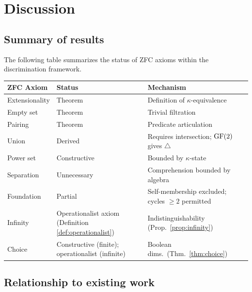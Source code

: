 \section{Discussion}\label{sec:discussion}

\subsection{Summary of results}

The following table summarizes the status of ZFC axioms within
the discrimination framework.

\medskip
\begin{center}
\begin{tabular}{l|l|l}
\textbf{ZFC Axiom} & \textbf{Status} & \textbf{Mechanism} \\
\hline
Extensionality & Theorem & Definition of $\kappa$-equivalence \\
Empty set & Theorem & Trivial filtration \\
Pairing & Theorem & Predicate articulation \\
Union & Derived & Requires intersection; $\operatorname{GF}(2)$ gives $\triangle$ \\
Power set & Constructive & Bounded by $\kappa$-state \\
Separation & Unnecessary & Comprehension bounded by algebra \\
Foundation & Partial & Self-membership excluded; cycles $\geq 2$ permitted \\
Infinity & Operationalist axiom (Definition \ref{def:operationalist}) & Indistinguishability (Prop.\ \ref{prop:infinity}) \\
Choice & Constructive (finite); operationalist (infinite) & Boolean dims.\ (Thm.\ \ref{thm:choice}) \\
\end{tabular}
\end{center}

\subsection{Relationship to existing work}


